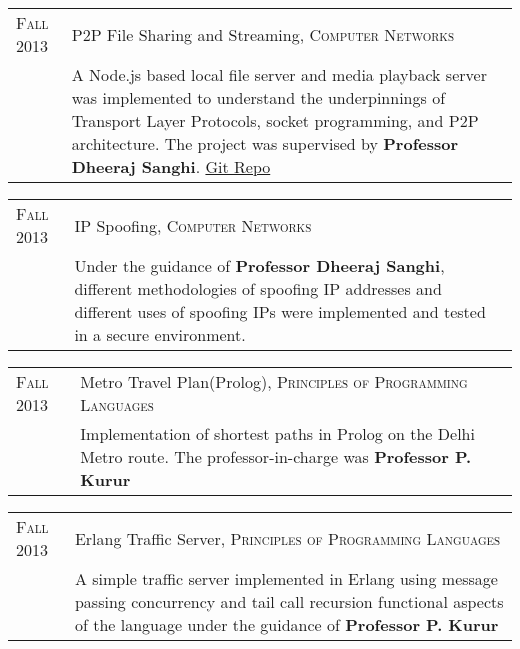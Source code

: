 \documentclass[a4paper,10pt]{article} %
\begin{document}
\begin{tabular}{p{2.2cm}|p{14cm}}
    \textsc{Fall 2013} & P2P File Sharing and Streaming, \textsc{Computer Networks} \\
                       & \footnotesize{A Node.js based local file server and media playback server was implemented
                          to understand the underpinnings of Transport Layer Protocols, socket programming,
                          and P2P architecture.  The project was supervised by \textbf{Professor Dheeraj Sanghi}.
                          \href{https://github.com/srijanshetty/nodesock} {Git Repo}}\\
\end{tabular}

\begin{tabular}{p{2.2cm}|p{14cm}}
    \textsc{Fall 2013} & IP Spoofing, \textsc{Computer Networks} \\
                       & \footnotesize{Under the guidance of \textbf{Professor Dheeraj Sanghi}, different methodologies
                          of spoofing IP addresses and different uses of spoofing IPs were implemented and tested
                          in a secure environment.}\\
\end{tabular}

\begin{tabular}{p{2.2cm}|p{14cm}}
    \textsc{Fall 2013} & Metro Travel Plan(Prolog), \textsc{Principles of Programming Languages} \\
                       & \footnotesize{Implementation of shortest paths in Prolog on the Delhi Metro route.
                          The professor-in-charge was \textbf{Professor P. Kurur}}\\
\end{tabular}

\begin{tabular}{p{2.2cm}|p{14cm}}
    \textsc{Fall 2013} & Erlang Traffic Server, \textsc{Principles of Programming Languages} \\
                       & \footnotesize{A simple traffic server implemented in Erlang using message passing
                          concurrency and tail call recursion functional aspects of the language under the
                          guidance of \textbf{Professor P. Kurur}}\\
\end{tabular}
\end{document}

